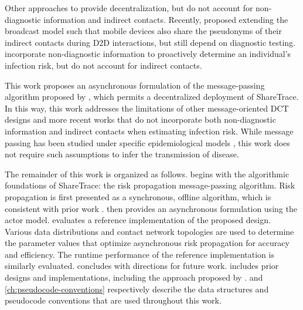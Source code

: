 Other approaches to  \citep{Cho2020, Reichert2020} provide decentralization, but do not account for non-diagnostic information and indirect contacts. Recently, \citet{Cherini2023} proposed extending the broadcast model such that mobile devices also share the pseudonyms of their indirect contacts during D2D interactions, but still depend on diagnostic testing. \citet{Gupta2023} incorporate non-diagnostic information to proactively determine an individual's infection risk, but do not account for indirect contacts.

This work proposes an asynchronous formulation of the message-passing algorithm proposed by \citet{Ayday2021}, which permits a decentralized deployment of ShareTrace. In this way, this work addresses the limitations of other message-oriented DCT designs \citep{Cho2020, Reichert2020} and more recent works \citep{Cherini2023, Gupta2023} that do not incorporate both non-diagnostic information and indirect contacts when estimating infection risk. While message passing has been studied under specific epidemiological models \citep{Karrer2010, Li2021}, this work does not require such assumptions to infer the transmission of disease.

The remainder of this work is organized as follows.  begins with the algorithmic foundations of ShareTrace: the risk propagation message-passing algorithm. Risk propagation is first presented as a synchronous, offline algorithm, which is consistent with prior work \citep{Ayday2021}.  then provides an asynchronous formulation using the actor model.  evaluates a reference implementation of the proposed design. Various data distributions and contact network topologies are used to determine the parameter values that optimize asynchronous risk propagation for accuracy and efficiency. The runtime performance of the reference implementation is similarly evaluated.  concludes with directions for future work.  includes prior designs and implementations, including the approach proposed by \citet{Tatton2022b}.  and \cref{ch:pseudocode-conventions} respectively describe the data structures and pseudocode conventions that are used throughout this work.